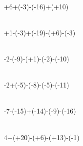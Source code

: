 \begin{multicols}{4}
\\ \vspace{-1em} 
+6+(-3)-(-16)+(+10)

\\ \vspace{-1em} 
+1-(-3)+(-19)-(+6)-(-3)

\\ \vspace{-1em} 
-2-(-9)-(+1)-(-2)-(-10)

\\ \vspace{-1em} 
-2+(-5)-(-8)-(-5)-(-11)

\\ \vspace{-1em} 
-7-(-15)+(-14)-(-9)-(-16)

\\ \vspace{-1em} 
4+(+20)-(+6)-(+13)-(-1)

\end{multicols}